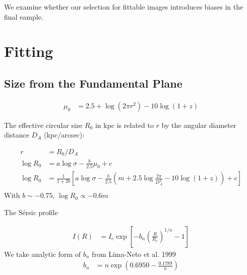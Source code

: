 \documentclass{aastex}
\newcommand{\Sersic}{S\'ersic}
\begin{document}
We examine whether our selection for fittable images introduces biases in the final eample.

\section{Fitting}
\subsection{Size from the Fundamental Plane}

\begin{eqnarray}
       \mu_0 &= 2.5 + \log(2 \pi r^2) - 10 \log(1+z)
   \end{eqnarray}   

The effective circular size $R_0$ in kpc is related to $r$ by
the angular diameter distance $D_A$ (kpc/arcsec):

\begin{align}
    r &= R_0 / D_A \\
    \log R_0 &= a \log \sigma - \frac{b}{2.5} \mu_0 + c \\
    \log R_0 &= \frac{1}{1 + 2 b} \left[ a\log \sigma
        - \frac{b}{2.5} \left(m + 2.5\log \frac{2\pi}{D_A^2} - 10 \log (1+z)\right)
        + c \right]\\
\end{align}
With $b \sim -0.75$, $\log R_0 \propto -0.6 m$


The \Sersic{} profile

\begin{align}
    I(R) &= I_e \exp \left[ -b_n \left( \frac{R}{R_e} \right)^{1/n} - 1 \right]
\end{align}
We take analytic form of $b_n$ from Lima-Neto et al. 1999
\begin{align}
    b_n &= n \exp\left(0.6950 - \frac{0.1789}{n}\right)
\end{align}
\end{document}
